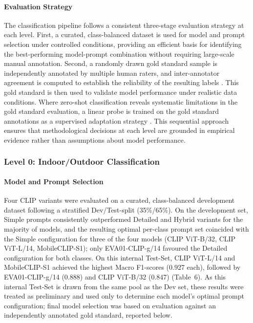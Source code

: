 \documentclass[hidelinks, 11pt]{article}
\begin{document}
\paragraph{Evaluation Strategy}
The classification pipeline follows a consistent three-stage evaluation strategy at each level. First, a curated, class-balanced dataset is used for model and prompt selection under controlled conditions, providing an efficient basis for identifying the best-performing model-prompt combination without requiring large-scale manual annotation. Second, a randomly drawn gold standard sample is independently annotated by multiple human raters, and inter-annotator agreement is computed to establish the reliability of the resulting labels \citep{artstein_survey_2008}. This gold standard is then used to validate model performance under realistic data conditions. Where zero-shot classification reveals systematic limitations in the gold standard evaluation, a linear probe is trained on the gold standard annotations as a supervised adaptation strategy \citep{radford_learning_2021}. This sequential approach ensures that methodological decisions at each level are grounded in empirical evidence rather than assumptions about model performance.

\subsubsection{Level 0: Indoor/Outdoor Classification}
\paragraph{Model and Prompt Selection}
Four CLIP variants were evaluated on a curated, class-balanced development dataset following a stratified Dev/Test-split (35\%/65\%). On the development set, Simple prompts consistently outperformed Detailed and Hybrid variants for the majority of models, and the resulting optimal per-class prompt set coincided with the Simple configuration for three of the four models (CLIP ViT-B/32, CLIP ViT-L/14, MobileCLIP-S1); only EVA01-CLIP-g/14 favoured the Detailed configuration for both classes. On this internal Test-Set, CLIP ViT-L/14 and MobileCLIP-S1 achieved the highest Macro F1-scores (0.927 each), followed by EVA01-CLIP-g/14 (0.888) and CLIP ViT-B/32 (0.847) (Table~6). As this internal Test-Set is drawn from the same pool as the Dev set, these results were treated as preliminary and used only to determine each model's optimal prompt configuration; final model selection was based on evaluation against an independently annotated gold standard, reported
below.
\end{document}
